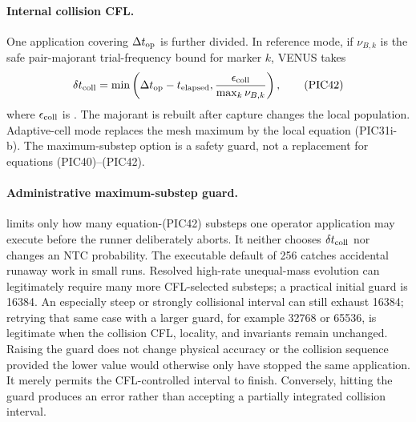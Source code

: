 \paragraph{Internal collision CFL.}
One application covering \(\Delta t_{\rm op}\) is further divided.  In
reference mode, if \(\nu_{B,k}\) is the safe pair-majorant trial-frequency
bound for marker \(k\), VENUS takes
\[
 \delta t_{\rm coll}=
 \min\left(\Delta t_{\rm op}-t_{\rm elapsed},
 \frac{\epsilon_{\rm coll}}{\max_k\nu_{B,k}}\right),    \tag{PIC42}
\]
where \(\epsilon_{\rm coll}\) is
.  The majorant is rebuilt after capture changes
the local population.  Adaptive-cell mode replaces the mesh maximum by the
local equation (PIC31i-b).  The maximum-substep option is a safety guard, not a
replacement for equations (PIC40)--(PIC42).

\paragraph{Administrative maximum-substep guard.}
 limits only how many
equation-(PIC42) substeps one operator application may execute before the
runner deliberately aborts.  It neither chooses \(\delta t_{\rm coll}\) nor
changes an NTC probability.  The executable default of 256 catches accidental
runaway work in small runs.  Resolved high-rate unequal-mass evolution can
legitimately require many more CFL-selected substeps; a practical initial
guard is 16384.  An especially steep or strongly collisional interval can
still exhaust 16384; retrying that same case with a larger guard, for example
32768 or 65536, is legitimate
when the collision CFL, locality, and invariants remain unchanged.  Raising
the guard does not change physical accuracy or the collision sequence
provided the lower value would otherwise only have stopped the same
application.  It merely permits the CFL-controlled interval to finish.
Conversely, hitting the guard produces an error rather than accepting a
partially integrated collision interval.

